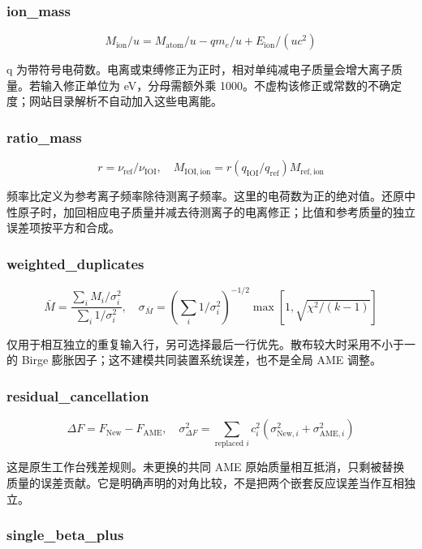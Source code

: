 \documentclass[
  11pt,
  letterpaper,
]{article}
\begin{document}
\subsubsection{ion\_mass}\label{ion_mass}

\[
M_{\mathrm{ion}}/u=M_{\mathrm{atom}}/u-q m_e/u+E_{\mathrm{ion}}/(u c^2)
\]

q
为带符号电荷数。电离或束缚修正为正时，相对单纯减电子质量会增大离子质量。若输入修正单位为
eV，分母需额外乘
1000。不虚构该修正或常数的不确定度；网站目录解析不自动加入这些电离能。

\subsubsection{ratio\_mass}\label{ratio_mass}

\[
r=\nu_{\mathrm{ref}}/\nu_{\mathrm{IOI}},\quad M_{\mathrm{IOI,ion}}=r(q_{\mathrm{IOI}}/q_{\mathrm{ref}})M_{\mathrm{ref,ion}}
\]

频率比定义为参考离子频率除待测离子频率。这里的电荷数为正的绝对值。还原中性原子时，加回相应电子质量并减去待测离子的电离修正；比值和参考质量的独立误差项按平方和合成。

\subsubsection{weighted\_duplicates}\label{weighted_duplicates}

\[
\bar M=\frac{\sum_i M_i/\sigma_i^2}{\sum_i1/\sigma_i^2},\quad \sigma_{\bar M}=(\sum_i1/\sigma_i^2)^{-1/2}\max[1,\sqrt{\chi^2/(k-1)}]
\]

仅用于相互独立的重复输入行，另可选择最后一行优先。散布较大时采用不小于一的
Birge 膨胀因子；这不建模共同装置系统误差，也不是全局 AME 调整。

\subsubsection{residual\_cancellation}\label{residual_cancellation}

\[
\Delta F=F_{\mathrm{New}}-F_{\mathrm{AME}},\quad \sigma_{\Delta F}^2=\sum_{\text{replaced }i}c_i^2(\sigma_{{\mathrm{New}},i}^2+\sigma_{{\mathrm{AME}},i}^2)
\]

这是原生工作台残差规则。未更换的共同 AME
原始质量相互抵消，只剩被替换质量的误差贡献。它是明确声明的对角比较，不是把两个嵌套反应误差当作互相独立。

\subsubsection{single\_beta\_plus}\label{single_beta_plus}
\end{document}
